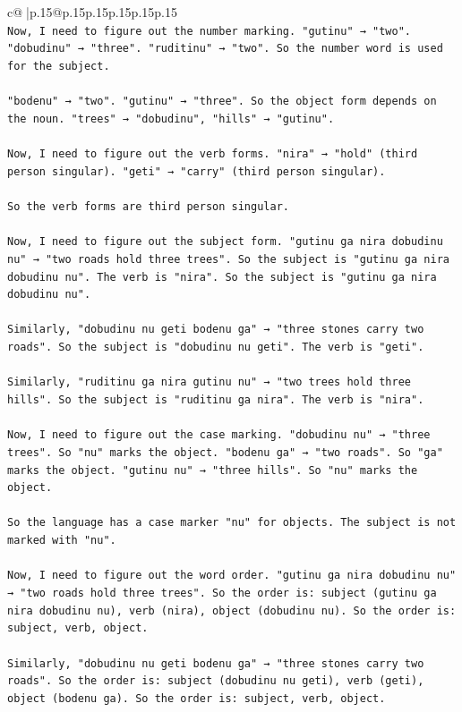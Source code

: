 \documentclass{article}
\begin{document}
{\begin{supertabular}{c@{$\;$}|p{.15\linewidth}@{}p{.15\linewidth}p{.15\linewidth}p{.15\linewidth}p{.15\linewidth}p{.15\linewidth}}
{{{\\ 
\texttt{Now, I need to figure out the number marking. "gutinu" → "two". "dobudinu" → "three". "ruditinu" → "two". So the number word is used for the subject.} \\
\\ 
\texttt{"bodenu" → "two". "gutinu" → "three". So the object form depends on the noun. "trees" → "dobudinu", "hills" → "gutinu".} \\
\\ 
\texttt{Now, I need to figure out the verb forms. "nira" → "hold" (third person singular). "geti" → "carry" (third person singular).} \\
\\ 
\texttt{So the verb forms are third person singular.} \\
\\ 
\texttt{Now, I need to figure out the subject form. "gutinu ga nira dobudinu nu" → "two roads hold three trees". So the subject is "gutinu ga nira dobudinu nu". The verb is "nira". So the subject is "gutinu ga nira dobudinu nu".} \\
\\ 
\texttt{Similarly, "dobudinu nu geti bodenu ga" → "three stones carry two roads". So the subject is "dobudinu nu geti". The verb is "geti".} \\
\\ 
\texttt{Similarly, "ruditinu ga nira gutinu nu" → "two trees hold three hills". So the subject is "ruditinu ga nira". The verb is "nira".} \\
\\ 
\texttt{Now, I need to figure out the case marking. "dobudinu nu" → "three trees". So "nu" marks the object. "bodenu ga" → "two roads". So "ga" marks the object. "gutinu nu" → "three hills". So "nu" marks the object.} \\
\\ 
\texttt{So the language has a case marker "nu" for objects. The subject is not marked with "nu".} \\
\\ 
\texttt{Now, I need to figure out the word order. "gutinu ga nira dobudinu nu" → "two roads hold three trees". So the order is: subject (gutinu ga nira dobudinu nu), verb (nira), object (dobudinu nu). So the order is: subject, verb, object.} \\
\\ 
\texttt{Similarly, "dobudinu nu geti bodenu ga" → "three stones carry two roads". So the order is: subject (dobudinu nu geti), verb (geti), object (bodenu ga). So the order is: subject, verb, object.} \\
}}}
\end{supertabular}}
\end{document}
